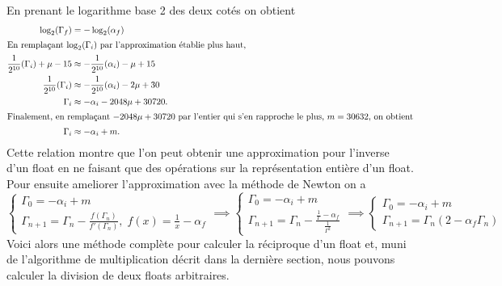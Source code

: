 \documentclass{article}
\begin{document}
En prenant le logarithme base 2 des deux cotés on obtient
\begin{align*}
    \log_2(\Gamma_f) &= -\log_2(\alpha_f)\\
    \intertext{En remplaçant $\log_2(\Gamma_i)$ par l'approximation établie plus haut,}
    \frac{1}{2^{10}}(\Gamma_i)+\mu-15 &\approx -\frac{1}{2^{10}}(\alpha_i)-\mu+15\\
    \frac{1}{2^{10}}(\Gamma_i) &\approx -\frac{1}{2^{10}}(\alpha_i)-2\mu+30\\
    \Gamma_i &\approx -\alpha_i-2048\mu+30720.\\
    \intertext{Finalement, en remplaçant $-2048\mu+30720$ par l'entier qui s'en rapproche le plus, $m = 30632$, on obtient}
    \Gamma_i &\approx -\alpha_i+m.
\end{align*}
Cette relation montre que l'on peut obtenir une approximation pour l'inverse d'un float en ne faisant que des opérations sur la représentation entière d'un float.
Pour ensuite ameliorer l'approximation avec la méthode de Newton on a
$$\begin{cases}
\Gamma_0 = -\alpha_i + m\\
\Gamma_{n+1} = \Gamma_n-\frac{f(\Gamma_n)}{f'(\Gamma_n)},\; f(x) = \frac{1}{x}-\alpha_f
\end{cases}
\implies
\begin{cases}
\Gamma_0 = -\alpha_i + m\\
\Gamma_{n+1} = \Gamma_n-\frac{\frac{1}{\Gamma}-\alpha_f}{\frac{1}{\Gamma^2}}
\end{cases}
\implies
\begin{cases}
\Gamma_0 = -\alpha_i + m\\
\Gamma_{n+1} = \Gamma_n(2-\alpha_f \Gamma_n)
\end{cases}
$$
Voici alors une méthode complète pour calculer la réciproque d'un float et, muni de l'algorithme de multiplication décrit dans la dernière section, nous pouvons calculer la division de deux floats arbitraires.
\end{document}
